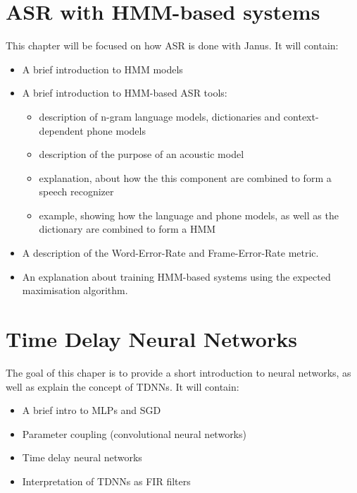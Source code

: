 
\chapter{ASR with HMM-based systems}
\label{ch:HMM_ASR}

This chapter will be focused on how ASR is done with Janus. It will contain: 
\begin{itemize}
    \item A brief introduction to HMM models
    \item A brief introduction to HMM-based ASR tools:
    \begin{itemize}
        \item description of n-gram language models, dictionaries and context-dependent phone models
        \item description of the purpose of an acoustic model
        \item explanation, about how the this component are combined to form a speech recognizer 
        \item example, showing how the language and phone models, as well as the dictionary are combined to form a HMM
    \end{itemize}
    \item A description of the Word-Error-Rate and Frame-Error-Rate metric. 
    \item An explanation about training HMM-based systems using the expected maximisation algorithm. 
\end{itemize}

\chapter{Time Delay Neural Networks}
\label{ch:TDNN}
The goal of this chaper is to provide a short introduction to neural networks, 
as well as explain the concept of TDNNs. It will contain:
\begin{itemize}
    \item A brief intro to MLPs and SGD
    \item Parameter coupling (convolutional neural networks)
    \item Time delay neural networks
    \item Interpretation of TDNNs as FIR filters
\end{itemize}

